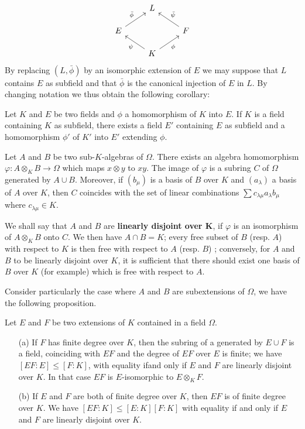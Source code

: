 \[\begin{tikzcd}[row sep=scriptsize]
&L&\\
E\ar[ru,"\bar{\phi}"]&&F\ar[lu,swap,"\bar{\psi}"]\\
&K\ar[ru,swap,"\phi"]\ar[lu,"\psi"]&
\end{tikzcd}\]
By replacing $(L,\bar{\phi})$ by an isomorphic extension of $E$ we may suppose that $L$ contains $E$ as subfield and that $\bar{\phi}$ is the canonical injection of $E$ in $L$. By changing notation we thus obtain the following corollary:
\begin{corollary}
Let $K$ and $E$ be two fields and $\phi$ a homomorphism of $K$ into $E$. If $K$ is a field containing $K$ as subfield, there exists a field $E'$ containing $E$ as subfield and a homomorphism $\phi'$ of $K'$ into $E'$ extending $\phi$.
\end{corollary}
Let $A$ and $B$ be two sub-$K$-algebras of $\Omega$. There exists an algebra homomorphism $\varphi:A\otimes_KB\to\Omega$ which maps $x\otimes y$ to $xy$. The image of $\varphi$ is a subring $C$ of $\Omega$ generated by $A\cup B$. Moreover, if $(b_\mu)$ is a basis of $B$ over $K$ and $(a_\lambda)$ a basis of $A$ over $K$, then $C$ coincides with the set of linear combinations $\sum c_{\lambda\mu}a_\lambda b_\mu$ where $c_{\lambda\mu}\in K$.\par
We shall say that $A$ and $B$ are \textbf{linearly disjoint over $\bm{K}$}, if $\varphi$ is an isomorphism of $A\otimes_KB$ onto $C$. We then have $A\cap B=K$; every free subset of $B$ (resp. $A$) with respect to $K$ is then free with respect to $A$ (resp. $B$) ; conversely, for $A$ and $B$ to be linearly disjoint over $K$, it is sufficient that there should exist one basis of $B$ over $K$ (for example) which is free with respect to $A$.\par
Consider particularly the case where $A$ and $B$ are subextensions of $\Omega$, we have the following proposition.
\begin{proposition}\label{linearly disjoint field and composite}
Let $E$ and $F$ be two extensions of $K$ contained in a field $\Omega$.
\begin{itemize}
\item[(a)] If $F$ has finite degree over $K$, then the subring of a generated by $E\cup F$ is a field, coinciding with $EF$ and the degree of $EF$ over $E$ is finite; we have $[EF:E]\leq [F:K]$, with equality ifand only if $E$ and $F$ are linearly disjoint over $K$. In that case $EF$ is $E$-isomorphic to $E\otimes_KF$.
\item[(b)] If $E$ and $F$ are both of finite degree over $K$, then $EF$ is of finite degree over $K$. We have $[EF:K]\leq [E:K][F:K]$ with equality if and only if $E$ and $F$ are linearly disjoint over $K$.
\end{itemize}
\end{proposition}

